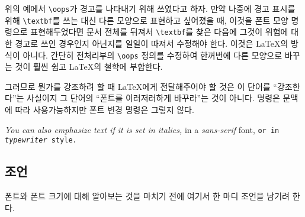 위의 예에서 \verb|\oops|가 경고를 나타내기 위해 쓰였다고 하자. 만약 나중에 경고 표시를 위해 \verb|\textbf|를 쓰는 대신 다른 모양으로 표현하고 싶어졌을 때, 이것을 폰트 모양 명령으로 표현해두었다면 문서 전체를 뒤져서 \verb|\textbf|를 찾은 다음에 그것이 위험에 대한 경고로 쓰인 경우인지 아닌지를 일일이 따져서
수정해야 한다. 이것은 \LaTeX 의 방식이 아니다. 간단히 전처리부의 \verb|\oops| 정의를 수정하여 한꺼번에 다른 모양으로 바꾸는 것이 훨씬 쉽고 \LaTeX 의 철학에 부합한다.

그러므로 뭔가를 강조하려 할 때 \LaTeX 에게 전달해주어야 할 것은 이 단어를 ``강조한다''는 사실이지 그 단어의 ``폰트를 이러저러하게 바꾸라''는 것이 아니다.
 명령은 문맥에 따라 사용가능하지만 폰트 변경 명령은 그렇지 않다.


\begin{example}
\textit{You can also
  \emph{emphasize} text if
  it is set in italics,}
\textsf{in a
  \emph{sans-serif} font,}
\texttt{or in
  \emph{typewriter} style.}
\end{example}


\subsection{조언}

폰트와 폰트 크기에 대해 알아보는 것을 마치기 전에 여기서 한 마디 조언을 남기려 한다.%

